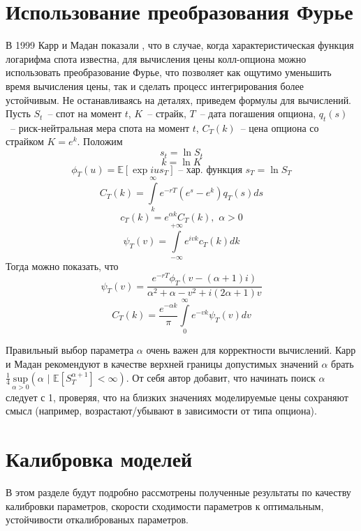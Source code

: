 \documentclass[oneside, final, 12pt, a4paper]{article}
\begin{document}
\section{Использование преобразования Фурье}
В 1999 Карр и Мадан показали \cite{FFT:paper}, что в случае, когда характеристическая функция логарифма спота известна, для вычисления цены колл-опциона можно использовать преобразование Фурье, что позволяет как ощутимо уменьшить время вычисления цены, так и сделать процесс интегрирования более устойчивым. Не останавливаясь на деталях, приведем формулы для вычислений. Пусть $S_t$~-- спот на момент $t$, $K$~-- страйк, $T$~-- дата погашения опциона, $q_t(s)$~-- риск-нейтральная мера спота на момент $t$, $C_T(k)$~-- цена опциона со страйком $K = e^k$. Положим
\[ s_t = \ln{S_t} \]
\[ k = \ln{K} \]
\[ \phi_T(u) = \mathbb{E}\left[ \exp{ius_T} \right] \text{~-- хар. функция } s_T=\ln{S_T}\]
\[ C_T(k) = \int\limits_k^\infty e^{-rT}(e^s - e^k)q_T(s)ds \]
\[ c_T(k) = e^{\alpha k}C_T(k),\,\, \alpha > 0 \]
\[ \psi_T(v) = \int\limits_{-\infty}^{+\infty} e^{ivk} c_T(k) dk\]
Тогда можно показать, что 
\[ \psi_T(v) = \frac{e^{-rT}\phi_T(v - (\alpha + 1)i)}{\alpha^2 + \alpha - v^2 + i(2\alpha + 1)v} \]
\[ C_T(k) = \frac{e^{-\alpha k}}{\pi} \int\limits_0^\infty e^{-vk} \psi_T(v) dv \]

Правильный выбор параметра $\alpha$ очень важен для корректности вычислений. Карр и Мадан рекомендуют в качестве верхней границы допустимых значений $\alpha$ брать 
\( \frac{1}{4} \, \underset{\alpha > 0}{\mathrm{sup}}(\alpha \,\, | \,\, \mathbb{E}[S_T^{\alpha+1}] < \infty) \). От себя автор добавит, что начинать поиск $\alpha$ следует с 1, проверяя, что на близких значениях моделируемые цены сохраняют смысл (например, возрастают/убывают в зависимости от типа опциона).


\newpage
\section{Калибровка моделей}
В этом разделе будут подробно рассмотрены полученные результаты по качеству калибровки параметров, скорости сходимости параметров к оптимальным, устойчивости откалиброваных параметров. 
\end{document}
